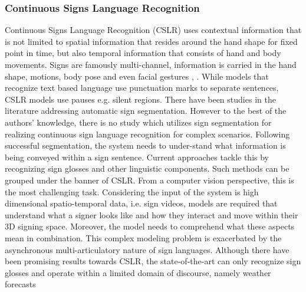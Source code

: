 \documentclass[twocolumn,conference]{article}
\begin{document}
\subsubsection{Continuous Signs Language Recognition}
Continuous Signs Language Recognition (CSLR) uses contextual information that is not limited to spatial information that resides around the hand shape for fixed point in time, but also temporal information that consists of hand and body movements. Signs are famously multi-channel, information is carried in the hand shape, motions, body pose and even facial gestures \cite{slimane2021context}, \cite{camgoz2017subunets}. While models that recognize text based language use punctuation marks to separate sentences, CSLR models use pauses e.g. silent regions. There have been studies in the literature addressing automatic sign segmentation. However to the best of the authors’ knowledge, there is no study which utilizes sign segmentation for realizing continuous sign language recognition for complex scenarios. Following successful segmentation, the system needs to under-stand what information is being conveyed within a sign sentence. Current approaches tackle this by recognizing sign glosses and other linguistic components. Such methods can be grouped under the banner of CSLR. From a computer vision perspective, this is the most challenging task. Considering the input of the system is high dimensional spatio-temporal data, i.e. sign videos, models are required that understand what a signer looks like and how they interact and move within their 3D signing space. Moreover, the model needs to comprehend what these aspects mean in combination. This complex modeling problem is exacerbated by the asynchronous multi-articulatory nature of sign languages. Although there have been promising results towards CSLR, the state-of-the-art can only recognize sign glosses and operate within a limited domain of discourse, namely weather forecasts \cite{camgoz2020sign}
\end{document}
